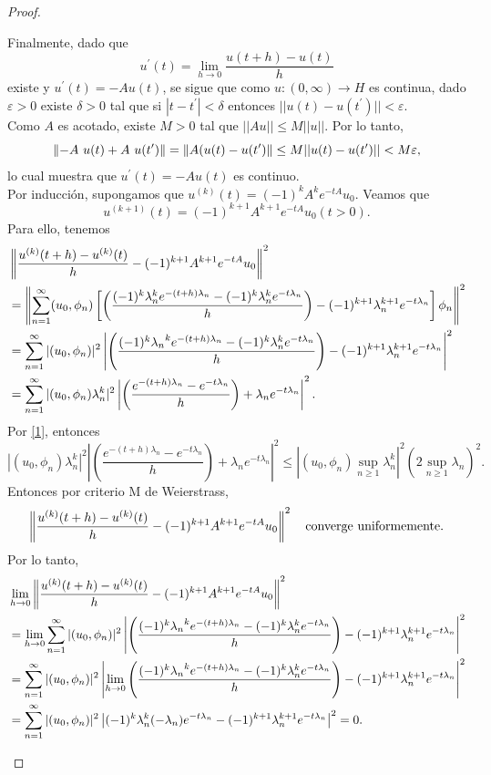 \begin{proof}
\begin{enumerate}
Finalmente, dado que \[u^{\prime}(t)=\lim_{h\rightarrow0}\frac{u(t+h)-u(t)}{h}\] existe y $u^{\prime}(t)=-Au(t)$, se sigue que como $u:(0,\infty)\rightarrow H$ es continua, dado $\varepsilon>0$ existe $\delta>0$ tal que si $|t-t^{\prime}|<\delta$ entonces $||u(t)-u(t^{\prime})||<\varepsilon$.\\
Como $A$ es acotado, existe $M>0$ tal que $||Au||\le M||u||$.
Por lo tanto, \[\left\|-A~u(t)+A~u(t^{\prime})\right\|=\left\|A(u(t)-u(t')\right\|\le M||u(t)-u(t^{\prime})||<M\varepsilon,\] lo cual muestra que $u^{\prime}(t)=-Au(t)$ es continuo. \\
Por inducción, supongamos que $u^{(k)}(t)=(-1)^{k}A^{k}e^{-tA}u_0$. Veamos que \[\displaystyle u^{(k+1)}(t)=(-1)^{k+1}A^{k+1}e^{-tA}u_0 (t>0).\]
Para ello, tenemos
\begin{align*}   
&\left\|\frac{u^{(k)}(t+h)-u^{(k)}(t)}{h}-(-1)^{k+1}A^{k+1}e^{-tA}u_0\right\|^{2}
\\&=\left\|\sum_{n=1}^{\infty}(u_{0},\phi_{n})\left[\left(\frac{(-1)^{k}\lambda_{n}^{k}e^{-(t+h)\lambda_{n}}-(-1)^{k}\lambda_{n}^{k}e^{-t\lambda_{n}}}{h}\right)-(-1)^{k+1}\lambda_{n}^{k+1}e^{-t\lambda_{n}}\right]\phi_{n}\right\|^{2}
\\&=\sum_{n=1}^{\infty}|(u_{0},\phi_{n})|^{2}\left|\left(\frac{(-1)^{k}{\lambda_{n}}^{k}e^{-(t+h)\lambda_{n}}-(-1)^{k}\lambda_{n}^{k}e^{-t\lambda_{n}}}{h}\right)-(-1)^{k+1}\lambda_{n}^{k+1}e^{-t\lambda_{n}}\right|^{2}\\&=\sum_{n=1}^{\infty}|(u_{0},\phi_{n})\lambda_{n}^{k}|^{2}\left|\left(\frac{e^{-(t+h)\lambda_{n}}-e^{-t\lambda_n}}{h}\right)+\lambda_{n}e^{-t\lambda_n}\right|^{2}.
\end{align*}
Por \ref{1}, entonces 
\[|(u_{0},\phi_{n})\lambda_{n}^{k}|^{2}\left|\left(\frac{e^{-(t+h)\lambda_n}-e^{-t\lambda_n}}{h}\right)+\lambda_{n}e^{-t\lambda_n}\right|^{2}
\le\left|(u_{0},\phi_{n})\sup_{n\geq 1}\lambda_n^k\right|^{2}(2\sup_{n\ge1}\lambda_{n})^{2}.\]
Entonces por criterio M de Weierstrass,
\[\left\|\frac{u^{(k)}(t+h)-u^{(k)}(t)}{h}-(-1)^{k+1}A^{k+1}e^{-tA}u_0\right\|^{2} \quad \text{converge uniformemente.}\] 
Por lo tanto,
\begin{align*}
&\lim_{h\rightarrow0}\left\|\frac{u^{(k)}(t+h)-u^{(k)}(t)}{h}-(-1)^{k+1}A^{k+1}e^{-tA}u_0\right\|^{2}
\\&=\lim_{h\rightarrow0}\sum_{n=1}^{\infty}|(u_{0},\phi_{n})|^{2}\left|\left(\frac{(-1)^{k}{\lambda_{n}}^{k}e^{-(t+h)\lambda_{n}}-(-1)^{k}\lambda_{n}^{k}e^{-t\lambda_{n}}}{h}\right)-(-1)^{k+1}\lambda_{n}^{k+1}e^{-t\lambda_{n}}\right|^{2}\\&=\sum_{n=1}^{\infty}|(u_{0},\phi_{n})|^{2}\left|\lim_{h\rightarrow0}\left(\frac{(-1)^{k}{\lambda_{n}}^{k}e^{-(t+h)\lambda_{n}}-(-1)^{k}\lambda_{n}^{k}e^{-t\lambda_{n}}}{h}\right)-(-1)^{k+1}\lambda_{n}^{k+1}e^{-t\lambda_{n}}\right|^{2}\\&=\sum_{n=1}^{\infty}|(u_{0},\phi_{n})|^{2}\left|(-1)^{k}\lambda_n^k(-\lambda_n)e^{-t\lambda_n}-(-1)^{k+1}\lambda_n^{k+1}e^{-t\lambda_n}\right|^{2}=0.
\end{align*}


\end{enumerate}
\end{proof}
